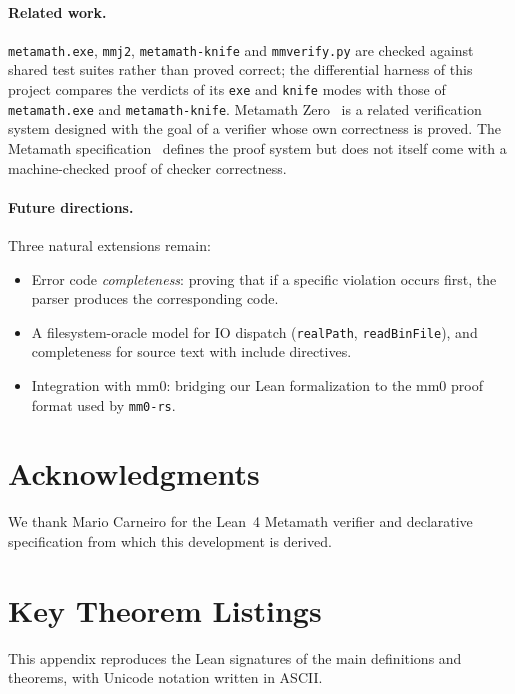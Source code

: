 \documentclass[11pt]{article}
\newcommand{\lean}[1]{\lstinline[language=Lean4]{#1}}
\begin{document}
\paragraph{Related work.}
\texttt{metamath.exe}, \texttt{mmj2}, \texttt{metamath-knife} and
\texttt{mmverify.py} are checked against shared test suites rather than
proved correct; the differential harness of this project compares the
verdicts of its \texttt{exe} and \texttt{knife} modes with those of
\texttt{metamath.exe} and \texttt{metamath-knife}.  Metamath
Zero~\cite{carneiro2019mm0} is a related verification system designed
with the goal of a verifier whose own correctness is proved.
The Metamath specification~\cite{megill2019} defines the proof system
but does not itself come with a machine-checked proof of checker
correctness.

\paragraph{Future directions.}
Three natural extensions remain:
\begin{itemize}[leftmargin=2em]
\item Error code \emph{completeness}: proving that if a specific
  violation occurs first, the parser produces the corresponding code.
\item A filesystem-oracle model for IO dispatch (\lean{realPath},
  \lean{readBinFile}), and completeness for source text with include
  directives.
\item Integration with mm0: bridging our Lean formalization to
  the mm0 proof format used by \texttt{mm0-rs}.
\end{itemize}

\section*{Acknowledgments}
We thank Mario Carneiro for the Lean~4 Metamath verifier and declarative
specification from which this development is derived.

\appendix

\section{Key Theorem Listings}
\label{app:listings}

This appendix reproduces the Lean signatures of the main definitions and
theorems, with Unicode notation written in ASCII.
\end{document}
